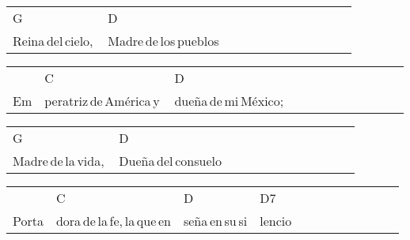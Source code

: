 \begin{multicols}{2}
\noindent
\begin{minipage}{\columnwidth}
\noindent
\noindent
\begin{tabular}{llllllllllll}
G&D\\
Reina\,del\,cielo,\,&Madre\,de\,los\,pueblos
\end{tabular}

\noindent
\begin{tabular}{llllllllllll}
&C&D\\
Em&peratriz\,de\,América\,y\,&dueña\,de\,mi\,México;
\end{tabular}

\noindent
\begin{tabular}{llllllllllll}
G&D\\
Madre\,de\,la\,vida,\,&Dueña\,del\,consuelo
\end{tabular}

\noindent
\begin{tabular}{llllllllllll}
&C&D&D7\\
Porta&dora\,de\,la\,fe,\,la\,que\,en&seña\,en\,su\,si&lencio
\end{tabular}
\end{minipage}\\


\chorus{}

\end{multicols}